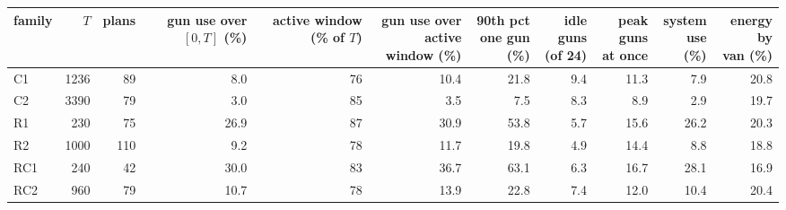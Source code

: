 \begin{tabular}{lrrrrrrrrrr}\toprule
family & $T$ & plans & \shortstack{gun use\\over $[0,T]$ (\%)} & \shortstack{active window\\(\% of $T$)} & \shortstack{gun use over\\active window (\%)} & \shortstack{90th pct\\one gun (\%)} & \shortstack{idle guns\\(of 24)} & \shortstack{peak guns\\at once} & \shortstack{system\\use (\%)} & \shortstack{energy by\\van (\%)} \\ \midrule
C1 & 1236 & 89 & 8.0 & 76 & 10.4 & 21.8 & 9.4 & 11.3 & 7.9 & 20.8 \\
C2 & 3390 & 79 & 3.0 & 85 & 3.5 & 7.5 & 8.3 & 8.9 & 2.9 & 19.7 \\
R1 & 230 & 75 & 26.9 & 87 & 30.9 & 53.8 & 5.7 & 15.6 & 26.2 & 20.3 \\
R2 & 1000 & 110 & 9.2 & 78 & 11.7 & 19.8 & 4.9 & 14.4 & 8.8 & 18.8 \\
RC1 & 240 & 42 & 30.0 & 83 & 36.7 & 63.1 & 6.3 & 16.7 & 28.1 & 16.9 \\
RC2 & 960 & 79 & 10.7 & 78 & 13.9 & 22.8 & 7.4 & 12.0 & 10.4 & 20.4 \\
\bottomrule\end{tabular}
